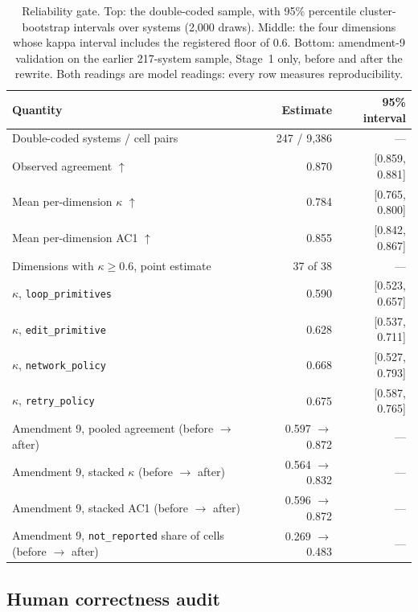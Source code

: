 \begin{table}[t]
  \footnotesize
  \caption{Reliability gate. Top: the double-coded sample, with 95\% percentile cluster-bootstrap
  intervals over systems (2,000 draws). Middle: the four dimensions whose kappa interval includes the
  registered floor of 0.6. Bottom: amendment-9 validation on the earlier 217-system sample, Stage~1 only,
  before and after the rewrite. Both readings are model readings: every row measures reproducibility.}
  \label{tab:reliability}
  \begin{tabular}{@{}l r r@{}}
    \toprule
    Quantity & Estimate & 95\% interval \\
    \midrule
    Double-coded systems / cell pairs & 247 / 9,386 & --- \\
    Observed agreement $\uparrow$ & 0.870 & [0.859, 0.881] \\
    Mean per-dimension $\kappa$ $\uparrow$ & 0.784 & [0.765, 0.800] \\
    Mean per-dimension AC1 $\uparrow$ & 0.855 & [0.842, 0.867] \\
    Dimensions with $\kappa \geq 0.6$, point estimate & 37 of 38 & --- \\
    \midrule
    $\kappa$, \texttt{loop\_primitives} & 0.590 & [0.523, 0.657] \\
    $\kappa$, \texttt{edit\_primitive} & 0.628 & [0.537, 0.711] \\
    $\kappa$, \texttt{network\_policy} & 0.668 & [0.527, 0.793] \\
    $\kappa$, \texttt{retry\_policy} & 0.675 & [0.587, 0.765] \\
    \midrule
    Amendment 9, pooled agreement (before $\to$ after) & 0.597 $\to$ 0.872 & --- \\
    Amendment 9, stacked $\kappa$ (before $\to$ after) & 0.564 $\to$ 0.832 & --- \\
    Amendment 9, stacked AC1 (before $\to$ after) & 0.596 $\to$ 0.872 & --- \\
    Amendment 9, \texttt{not\_reported} share of cells (before $\to$ after) & 0.269 $\to$ 0.483 & --- \\
    \bottomrule
  \end{tabular}
\end{table}

\subsection{Human correctness audit}\label{subsec:humanaudit}

